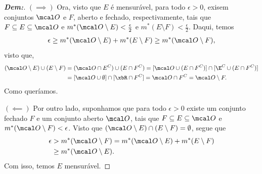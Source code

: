 \bigline
\begin{proof}[\textbf{Dem:}]
  \hfill 
  
  \noindent 
  $(\implies)$ Ora, visto que $E$ é mensurável, para todo $\epsilon > 0$, exisem conjuntos 
  $\mcal O$ e $F$, aberto e fechado, respectivamente, tais que 
  $F\subseteq E \subseteq \mcal O$ e $m^*(\mcal O\setminus E) < \frac{\epsilon}{2}$
  e $m^*(E\setminus F) < \frac{\epsilon}{2}$. Daqui, temos
  \begin{align*}
    \epsilon \ge m^*(\mcal O\setminus E) + m^*(E\setminus F) \ge m^*(\mcal O \setminus F), 
  \end{align*}
  visto que, 
  \begin{align*}
    (\mcal O \setminus E) \cup (E \setminus F) &= 
    (\mcal O \cap E^C) \cup (E \cap F^C) = [\mcal O \cup (E \cap F^C)] \cap [\E^C \cup 
    (E \cap F^C)]\\ 
    &= [\mcal O\cup \emptyset] \cap [\xbR \cap F^C]
    = \mcal O \cap F^C = \mcal O \setminus F.
  \end{align*}
  Como queríamos.

  \noindent 
  $(\impliedby)$ Por outro lado, suponhamos que para todo $\epsilon>0$ existe 
  um conjunto fechado $F$ e um conjunto aberto $\mcal O$, tais que 
  $F \subseteq E \subseteq \mcal O$ e $m^*(\mcal O\setminus F) < \epsilon$.
  Visto que $(\mcal O\setminus E) \cap (E\setminus F) = \emptyset$, segue que 
  \begin{align*}
    \epsilon &> m^*(\mcal O\setminus F) = m^*(\mcal O \setminus E) + m^*(E \setminus F)\\
    &\ge m^*(\mcal O\setminus E).
  \end{align*}
  Com isso, temos $E$ mensurável.
\end{proof}
\biglinend
\newpage
{}
\myexe{\thedois}
\bigline 
